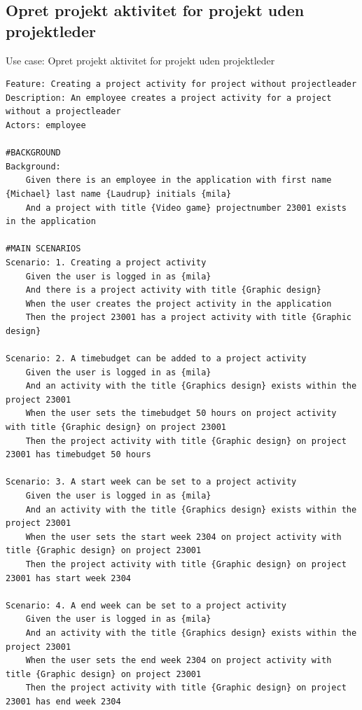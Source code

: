 \subsection{Opret projekt aktivitet for projekt uden projektleder} 
\begin{listing}[H]
    \centering
    \caption{Use case: Opret projekt aktivitet for projekt uden projektleder} \label{lst:usecase_regular_activity}
    \begin{verbatim}  
Feature: Creating a project activity for project without projectleader
Description: An employee creates a project activity for a project without a projectleader
Actors: employee

#BACKGROUND
Background:
    Given there is an employee in the application with first name {Michael} last name {Laudrup} initials {mila}
    And a project with title {Video game} projectnumber 23001 exists in the application

#MAIN SCENARIOS
Scenario: 1. Creating a project activity
    Given the user is logged in as {mila}
    And there is a project activity with title {Graphic design}  
    When the user creates the project activity in the application 
    Then the project 23001 has a project activity with title {Graphic design} 

Scenario: 2. A timebudget can be added to a project activity
    Given the user is logged in as {mila}
    And an activity with the title {Graphics design} exists within the project 23001
    When the user sets the timebudget 50 hours on project activity with title {Graphic design} on project 23001
    Then the project activity with title {Graphic design} on project 23001 has timebudget 50 hours 

Scenario: 3. A start week can be set to a project activity
    Given the user is logged in as {mila}
    And an activity with the title {Graphics design} exists within the project 23001
    When the user sets the start week 2304 on project activity with title {Graphic design} on project 23001
    Then the project activity with title {Graphic design} on project 23001 has start week 2304

Scenario: 4. A end week can be set to a project activity
    Given the user is logged in as {mila}
    And an activity with the title {Graphics design} exists within the project 23001
    When the user sets the end week 2304 on project activity with title {Graphic design} on project 23001
    Then the project activity with title {Graphic design} on project 23001 has end week 2304


\end{verbatim}
\end{listing}

